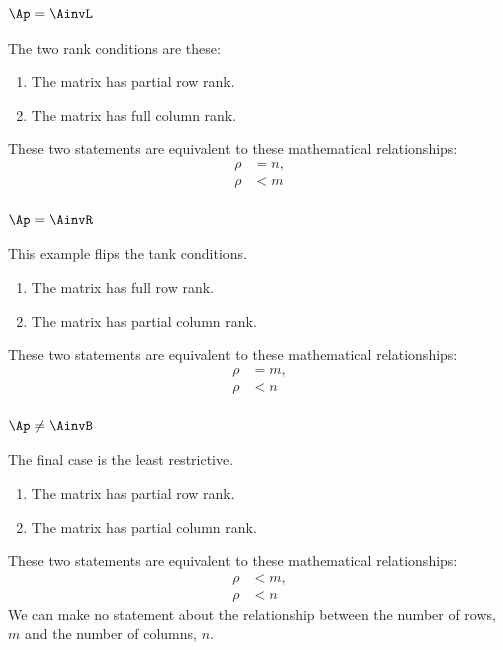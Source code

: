 \subsubsection{$\Ap=\AinvL$}
\label{sec:lchiral}
The two rank conditions are these:
\begin{enumerate}
\item The matrix has partial row rank.
\item The matrix has full column rank.
\end{enumerate}
These two statements are equivalent to these mathematical relationships:
\begin{equation}
  \begin{split}
     \rho &= n, \\
     \rho &< m
  \end{split}
\end{equation}

\subsubsection{$\Ap=\AinvR$}
This example flips the tank conditions.
\begin{enumerate}
\item The matrix has full row rank.
\item The matrix has partial column rank.
\end{enumerate}
These two statements are equivalent to these mathematical relationships:
\begin{equation}
  \begin{split}
     \rho &= m, \\
     \rho &< n
  \end{split}
\end{equation}


\subsubsection{$\Ap\ne\AinvB$}
The final case is the least restrictive.
\begin{enumerate}
\item The matrix has partial row rank.
\item The matrix has partial column rank.
\end{enumerate}
These two statements are equivalent to these mathematical relationships:
\begin{equation}
  \begin{split}
     \rho &< m, \\
     \rho &< n
  \end{split}
\end{equation}
We can make no statement about the relationship between the number of rows, $m$ and the number of columns, $n$.

